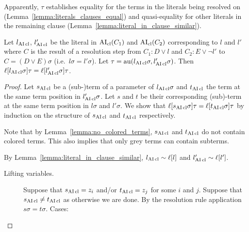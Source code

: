 \documentclass[,%
	paper=a4,%
	DIV12, %
	twoside=false,%
	liststotoc,
	bibtotoc,
	draft=false,%
	numbers=noendperiod
]{scrartcl}
\begin{document}
Apparently, $\tau$ establishes equality for the terms in the literals being resolved on (Lemma~\ref{lemma:literals_clauses_equal}) and quasi-equality for other literals in the remaining clause (Lemma~\ref{lemma:literal_in_clause_similar}).
\begin{lemma}
	\label{lemma:literals_clauses_equal}
	Let $l_{\operatorname{AI}\mathrm{cl}}$, $l_{\operatorname{AI}\mathrm{cl}}'$ be the literal in $\operatorname{AI}_\mathrm{cl}(C_1)$ and $\operatorname{AI}_\mathrm{cl}(C_2)$ corresponding to $l$ and $l'$ where 
	$C$ is the result of a resolution step from $C_1: D\lor l$ and $C_2: E\lor \lnot l'$ to $C = (D \lor E)\sigma$
	(i.e.~$l\sigma=l'\sigma$).
	Let $\tau = \operatorname{au}(l_{\operatorname{AI}\mathrm{cl}}\sigma, l_{\operatorname{AI}\mathrm{cl}}'\sigma)$. Then $\ell[l_{\operatorname{AI}\mathrm{cl}}\sigma]\tau = \ell[l_{\operatorname{AI}\mathrm{cl}}'\sigma]\tau$.
\end{lemma}
\begin{proof} 
	Let $s_{\operatorname{AI}\mathrm{cl}}$ be a (sub-)term of a parameter of $l_{\operatorname{AI}\mathrm{cl}}\sigma$ and $t_{\operatorname{AI}\mathrm{cl}}$ the term at the same term position in $l_{\operatorname{AI}\mathrm{cl}}'\sigma$.
	Let $s$ and $t$ be their corresponding (sub)-term at the same term position in $l\sigma$ and $l'\sigma$.
	We show that $\ell[s_{\operatorname{AI}\mathrm{cl}}\sigma]\tau = \ell[t_{\operatorname{AI}\mathrm{cl}}\sigma]\tau$ by induction on the structure of $s_{\operatorname{AI}\mathrm{cl}}$ and $t_{\operatorname{AI}\mathrm{cl}}$ respectively.

	Note that by Lemma~\ref{lemma:no_colored_terms}, $s_{\operatorname{AI}\mathrm{cl}}$ and $t_{\operatorname{AI}\mathrm{cl}}$ do not contain colored terms. This also implies that only grey terms can contain subterms.

	By Lemma~\ref{lemma:literal_in_clause_similar}, $l_{\operatorname{AI}\mathrm{cl}} \sim \ell[l]$ and
	$l'_{\operatorname{AI}\mathrm{cl}} \sim \ell[l']$. 

	\begin{description}
		\item[Lifting variables.]

			Suppose that $s_{\operatorname{AI}\mathrm{cl}} = z_i$ and/or $t_{\operatorname{AI}\mathrm{cl}} = z_j$ for some $i$ and $j$.
			Suppose that $s_{\operatorname{AI}\mathrm{cl}} \neq t_{\operatorname{AI}\mathrm{cl}}$ as otherwise we are done.
			By the resolution rule application $s\sigma = t\sigma$. Cases:
\end{description}
\end{proof}
\end{document}
